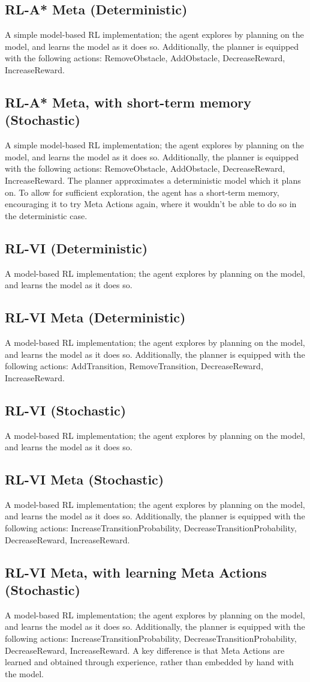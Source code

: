 \subsection{RL-A* Meta (Deterministic)}
A simple model-based RL implementation; the agent explores by planning on the model, and learns the model as it does so.
Additionally, the planner is equipped with the following actions: RemoveObstacle, AddObstacle, DecreaseReward, IncreaseReward.
\subsection{RL-A* Meta, with short-term memory (Stochastic)}
A simple model-based RL implementation; the agent explores by planning on the model, and learns the model as it does so.
Additionally, the planner is equipped with the following actions: RemoveObstacle, AddObstacle, DecreaseReward, IncreaseReward. The planner approximates a deterministic model which it plans on. To allow for sufficient exploration, the agent has a short-term memory, encouraging it to try Meta Actions again, where it wouldn't be able to do so in the deterministic case.
\subsection{RL-VI (Deterministic)}
A model-based RL implementation; the agent explores by planning on the model, and learns the model as it does so.
\subsection{RL-VI Meta (Deterministic)}
A model-based RL implementation; the agent explores by planning on the model, and learns the model as it does so.
Additionally, the planner is equipped with the following actions: AddTransition, RemoveTransition, DecreaseReward, IncreaseReward.
\subsection{RL-VI (Stochastic)}
A model-based RL implementation; the agent explores by planning on the model, and learns the model as it does so.
\subsection{RL-VI Meta (Stochastic)}
A model-based RL implementation; the agent explores by planning on the model, and learns the model as it does so.
Additionally, the planner is equipped with the following actions: IncreaseTransitionProbability, DecreaseTransitionProbability, DecreaseReward, IncreaseReward.
\subsection{RL-VI Meta, with learning Meta Actions (Stochastic)}
A model-based RL implementation; the agent explores by planning on the model, and learns the model as it does so.
Additionally, the planner is equipped with the following actions: IncreaseTransitionProbability, DecreaseTransitionProbability, DecreaseReward, IncreaseReward. A key difference is that Meta Actions are learned and obtained through experience, rather than embedded by hand with the model.